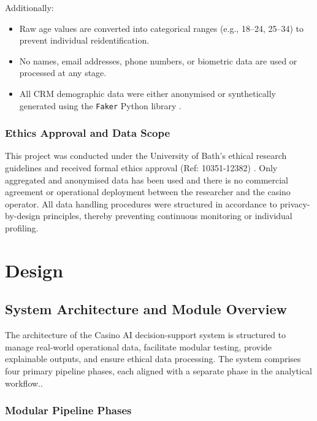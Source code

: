 \documentclass[12pt,a4paper]{report}
\begin{document}
Additionally:

\begin{itemize}
  \item Raw age values are converted into categorical ranges (e.g., 18–24, 25–34) to prevent individual reidentification.
  \item No names, email addresses, phone numbers, or biometric data are used or processed at any stage.
  \item All CRM demographic data were either anonymised or synthetically generated using the \texttt{Faker} Python library \citep{faker2025}.
\end{itemize}

\subsection*{Ethics Approval and Data Scope}

This project was conducted under the University of Bath’s ethical research guidelines and received formal ethics approval (Ref: 10351-12382) \citep{bathEthics}. Only aggregated and anonymised data has been used and there is no commercial agreement or operational deployment between the researcher and the casino operator.  All data handling procedures were structured in accordance to privacy-by-design principles, thereby preventing continuous monitoring or individual profiling.

\chapter{Design}

\section{System Architecture and Module Overview}

The architecture of the Casino AI decision-support system is structured to manage real-world operational data, facilitate modular testing, provide explainable outputs, and ensure ethical data processing.  The system comprises four primary pipeline phases, each aligned with a separate phase in the analytical workflow..

\subsection{Modular Pipeline Phases}
\end{document}
